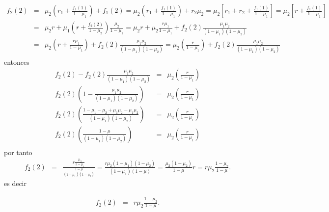 \documentclass{article}
\numberwithin{equation}{section}
\begin{document}
\begin{eqnarray*}
f_{2}\left(2\right)&=&\mu_{2}\left(r_{1}+\frac{f_{1}\left(1\right)}{1-\mu_{1}}\right)+f_{1}\left(2\right)=\mu_{2}\left(r_{1}+\frac{f_{1}\left(1\right)}{1-\mu_{1}}\right)+r_{2}\mu_{2}=\mu_{2}\left[r_{1}+r_{2}+\frac{f_{1}\left(1\right)}{1-\mu_{1}}\right]=\mu_{2}\left[r+\frac{f_{1}\left(1\right)}{1-\mu_{1}}\right]\\
&=&\mu_{2}r+\mu_{1}\left(r+\frac{f_{2}\left(2\right)}{1-\mu_{2}}\right)\frac{\mu_{2}}{1-\mu_{1}}=\mu_{2}r+\mu_{2}\frac{r\mu_{1}}{1-\mu_{1}}+f_{2}\left(2\right)\frac{\mu_{1}\mu_{2}}{\left(1-\mu_{1}\right)\left(1-\mu_{2}\right)}\\
&=&\mu_{2}\left(r+\frac{r\mu_{1}}{1-\mu_{1}}\right)+f_{2}\left(2\right)\frac{\mu_{1}\mu_{2}}{\left(1-\mu_{1}\right)\left(1-\mu_{2}\right)}=\mu_{2}\left(\frac{r}{1-\mu_{1}}\right)+f_{2}\left(2\right)\frac{\mu_{1}\mu_{2}}{\left(1-\mu_{1}\right)\left(1-\mu_{2}\right)}\\
\end{eqnarray*}
entonces
\begin{eqnarray*}
f_{2}\left(2\right)-f_{2}\left(2\right)\frac{\mu_{1}\mu_{2}}{\left(1-\mu_{1}\right)\left(1-\mu_{2}\right)}&=&\mu_{2}\left(\frac{r}{1-\mu_{1}}\right)\\
f_{2}\left(2\right)\left(1-\frac{\mu_{1}\mu_{2}}{\left(1-\mu_{1}\right)\left(1-\mu_{2}\right)}\right)&=&\mu_{2}\left(\frac{r}{1-\mu_{1}}\right)\\
f_{2}\left(2\right)\left(\frac{1-\mu_{1}-\mu_{2}+\mu_{1}\mu_{2}-\mu_{1}\mu_{2}}{\left(1-\mu_{1}\right)\left(1-\mu_{2}\right)}\right)&=&\mu_{2}\left(\frac{r}{1-\mu_{1}}\right)\\
f_{2}\left(2\right)\left(\frac{1-\mu}{\left(1-\mu_{1}\right)\left(1-\mu_{2}\right)}\right)&=&\mu_{2}\left(\frac{r}{1-\mu_{1}}\right)\\
\end{eqnarray*}
por tanto
\begin{eqnarray*}
f_{2}\left(2\right)&=&\frac{r\frac{\mu_{2}}{1-\mu_{1}}}{\frac{1-\mu}{\left(1-\mu_{1}\right)\left(1-\mu_{2}\right)}}=\frac{r\mu_{2}\left(1-\mu_{1}\right)\left(1-\mu_{2}\right)}{\left(1-\mu_{1}\right)\left(1-\mu\right)}=\frac{\mu_{2}\left(1-\mu_{2}\right)}{1-\mu}r=r\mu_{2}\frac{1-\mu_{2}}{1-\mu}.
\end{eqnarray*}
es decir

\begin{eqnarray}
f_{2}\left(2\right)&=&r\mu_{2}\frac{1-\mu_{2}}{1-\mu}.
\end{eqnarray}
\end{document}
